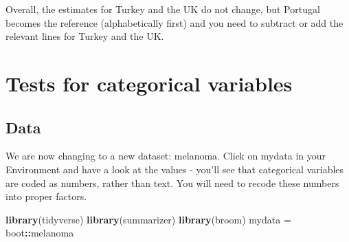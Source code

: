 \documentclass[]{book}
\makeatletter
\newenvironment{Shaded}{\begin{snugshade}}{\end{snugshade}}
\newcommand{\KeywordTok}[1]{\textcolor[rgb]{0.13,0.29,0.53}{\textbf{#1}}}
\newcommand{\DataTypeTok}[1]{\textcolor[rgb]{0.13,0.29,0.53}{#1}}
\newcommand{\DecValTok}[1]{\textcolor[rgb]{0.00,0.00,0.81}{#1}}
\newcommand{\StringTok}[1]{\textcolor[rgb]{0.31,0.60,0.02}{#1}}
\newcommand{\OperatorTok}[1]{\textcolor[rgb]{0.81,0.36,0.00}{\textbf{#1}}}
\newcommand{\NormalTok}[1]{#1}
\newenvironment{kframe}{%
\medskip{}
\setlength{\fboxsep}{.8em}
 \def\at@end@of@kframe{}%
 \ifinner\ifhmode%
  \def\at@end@of@kframe{\end{minipage}}%
  \begin{minipage}{\columnwidth}%
 \fi\fi%
 \def\FrameCommand##1{\hskip\@totalleftmargin \hskip-\fboxsep
 \colorbox{shadecolor}{##1}\hskip-\fboxsep
     \hskip-\linewidth \hskip-\@totalleftmargin \hskip\columnwidth}%
 \MakeFramed {\advance\hsize-\width
   \@totalleftmargin\z@ \linewidth\hsize
   \@setminipage}}%
 {\par\unskip\endMakeFramed%
 \at@end@of@kframe}
\renewenvironment{Shaded}{\begin{kframe}}{\end{kframe}}
\makeatother
\begin{document}
\begin{Shaded}
\end{Shaded}

Overall, the estimates for Turkey and the UK do not change, but Portugal
becomes the reference (alphabetically first) and you need to subtract or
add the relevant lines for Turkey and the UK.

\chapter{Tests for categorical
variables}\label{tests-for-categorical-variables}

\section{Data}\label{data-4}

We are now changing to a new dataset: melanoma. Click on mydata in your
Environment and have a look at the values - you'll see that categorical
variables are coded as numbers, rather than text. You will need to
recode these numbers into proper factors.

\begin{Shaded}
\begin{Highlighting}[]
\KeywordTok{library}\NormalTok{(tidyverse)}
\KeywordTok{library}\NormalTok{(summarizer)}
\KeywordTok{library}\NormalTok{(broom)}
\NormalTok{mydata =}\StringTok{ }\NormalTok{boot}\OperatorTok{::}\NormalTok{melanoma}
\end{Highlighting}
\end{Shaded}
\end{document}
